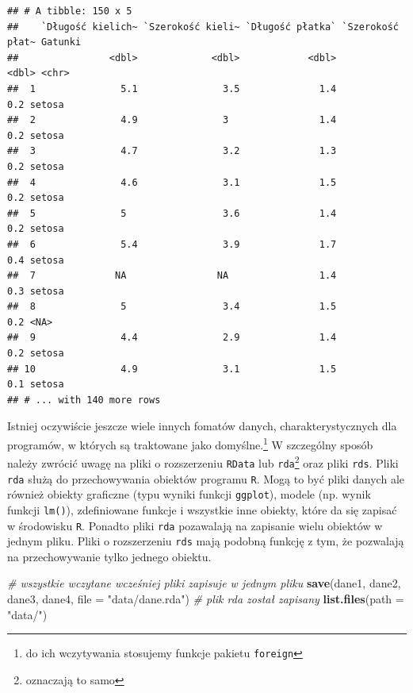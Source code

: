 \documentclass[
]{book}
\newenvironment{Shaded}{\begin{snugshade}}{\end{snugshade}}
\newcommand{\CommentTok}[1]{\textcolor[rgb]{0.56,0.35,0.01}{\textit{#1}}}
\newcommand{\DataTypeTok}[1]{\textcolor[rgb]{0.13,0.29,0.53}{#1}}
\newcommand{\KeywordTok}[1]{\textcolor[rgb]{0.13,0.29,0.53}{\textbf{#1}}}
\newcommand{\NormalTok}[1]{#1}
\newcommand{\StringTok}[1]{\textcolor[rgb]{0.31,0.60,0.02}{#1}}
\theoremstyle{plain}
\theoremstyle{definition}
\theoremstyle{definition}
\theoremstyle{definition}
\theoremstyle{definition}
\theoremstyle{remark}
\begin{document}
\begin{verbatim}
## # A tibble: 150 x 5
##    `Długość kielich~ `Szerokość kieli~ `Długość płatka` `Szerokość płat~ Gatunki
##                <dbl>             <dbl>            <dbl>            <dbl> <chr>  
##  1               5.1               3.5              1.4              0.2 setosa 
##  2               4.9               3                1.4              0.2 setosa 
##  3               4.7               3.2              1.3              0.2 setosa 
##  4               4.6               3.1              1.5              0.2 setosa 
##  5               5                 3.6              1.4              0.2 setosa 
##  6               5.4               3.9              1.7              0.4 setosa 
##  7              NA                NA                1.4              0.3 setosa 
##  8               5                 3.4              1.5              0.2 <NA>   
##  9               4.4               2.9              1.4              0.2 setosa 
## 10               4.9               3.1              1.5              0.1 setosa 
## # ... with 140 more rows
\end{verbatim}

Istniej oczywiście jeszcze wiele innych fomatów danych, charakterystycznych dla programów, w których są traktowane jako domyślne.\footnote{do ich wczytywania stosujemy funkcje pakietu \texttt{foreign}} W szczególny sposób należy zwrócić uwagę na pliki o rozszerzeniu \texttt{RData} lub \texttt{rda}\footnote{oznaczają to samo} oraz pliki \texttt{rds}. Pliki \texttt{rda} służą do przechowywania obiektów programu \texttt{R}. Mogą to być pliki danych ale również obiekty graficzne (typu wyniki funkcji \texttt{ggplot}), modele (np. wynik funkcji \texttt{lm()}), zdefiniowane funkcje i wszystkie inne obiekty, które da się zapisać w środowisku \texttt{R}. Ponadto pliki \texttt{rda} pozawalają na zapisanie wielu obiektów w jednym pliku. Pliki o rozszerzeniu \texttt{rds} mają podobną funkcję z tym, że pozwalają na przechowywanie tylko jednego obiektu.

\begin{Shaded}
\begin{Highlighting}[]
\CommentTok{# wszystkie wczytane wcześniej pliki zapisuje w jednym pliku}
\KeywordTok{save}\NormalTok{(dane1, dane2, dane3, dane4, }\DataTypeTok{file =} \StringTok{"data/dane.rda"}\NormalTok{)}
\CommentTok{# plik rda został zapisany}
\KeywordTok{list.files}\NormalTok{(}\DataTypeTok{path =} \StringTok{"data/"}\NormalTok{)}
\end{Highlighting}
\end{Shaded}
\end{document}
